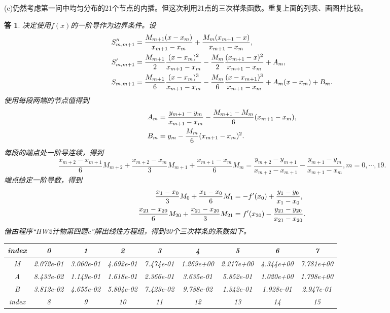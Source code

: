\documentclass[10pt]{ctexart}
\newtheorem*{answer}{答}
\begin{document}
(c)仍然考虑第一问中均匀分布的21个节点的内插。但这次利用21点的三次样条函数。重复上面的列表、画图并比较。
\begin{answer}
    决定使用$f(x)$的一阶导作为边界条件。设
    \begin{align}
        S_{m,m+1}''&=\frac{M_{m+1}(x-x_m)}{x_{m+1}-x_m}+\frac{M_{m}(x_{m+1}-x)}{x_{m+1}-x_m},\notag\\
        S_{m,m+1}'&=\frac{M_{m+1}}{2}\frac{(x-x_m)^2}{x_{m+1}-x_m}-\frac{M_{m}}{2}\frac{(x_{m+1}-x)^2}{x_{m+1}-x_{m}}+A_m,\notag\\
        S_{m,m+1}&=\frac{M_{m+1}}{6}\frac{(x-x_m)^3}{x_{m+1}-x_m}-\frac{M_{m}}{6}\frac{(x-x_{m+1})^3}{x_{m+1}-x_{m}}+A_m(x-x_m)+B_m.\notag
    \end{align}
    使用每段两端的节点值得到
    \begin{align}
        A_m&=\frac{y_{m+1}-y_m}{x_{m+1}-x_{m}}-\frac{M_{m+1}-M_{m}}{6}(x_{m+1}-x_{m}),\notag\\
        B_m&=y_m-\frac{M_{m}}{6}(x_{m+1}-x_m)^2.\notag
    \end{align}
    每段的端点处一阶导连续，得到
    $$\frac{x_{m+2}-x_{m+1}}{6}M_{m+2}+\frac{x_{m+2}-x_m}{3}M_{m+1}+\frac{x_{m+1}-x_m}{6}M_m=\frac{y_{m+2}-y_{m+1}}{x_{m+2}-x_{m+1}}-\frac{y_{m+1}-y_m}{x_{m+1}-x_m},m=0,\cdots,19.$$
    端点给定一阶导数，得到
    \begin{align}
        \frac{x_1-x_0}{3}M_0+\frac{x_1-x_0}{6}M_1&=-f'(x_0)+\frac{y_1-y_0}{x_1-x_0},\notag\\
        \frac{x_{21}-x_{20}}{6}M_{20}+\frac{x_{21}-x_{20}}{3}M_{21}&=f'(x_{20})-\frac{y_{21}-y_{20}}{x_{21}-x_{20}}.\notag
    \end{align}
    借由程序“HW2计物第四题c”解出线性方程组，得到20个三次样条的系数如下。
    \begin{table}[H]
        \centering
        \begin{tabular}{ccccccccc}
            \toprule
            index & 0 & 1 & 2 & 3 & 4 & 5 & 6 & 7\\
            \midrule
            M & 2.072e-01 & 3.060e-01 & 4.692e-01 & 7.474e-01 & 1.269e+00 & 2.217e+00 & 4.344e+00 & 7.781e+00 \\
            A & 8.433e-02 & 1.149e-01 & 1.618e-01 & 2.366e-01 & 3.635e-01 & 5.852e-01 & 1.020e+00 & 1.798e+00 \\
            B & 3.812e-02 & 4.655e-02 & 5.804e-02 & 7.423e-02 & 9.788e-02 & 1.342e-01 & 1.928e-01 & 2.947e-01 \\
            \bottomrule
            \toprule
            index & 8 & 9 & 10 & 11 & 12 & 13 & 14 & 15\\

\end{tabular}
\end{table}
\end{answer}
\end{document}
